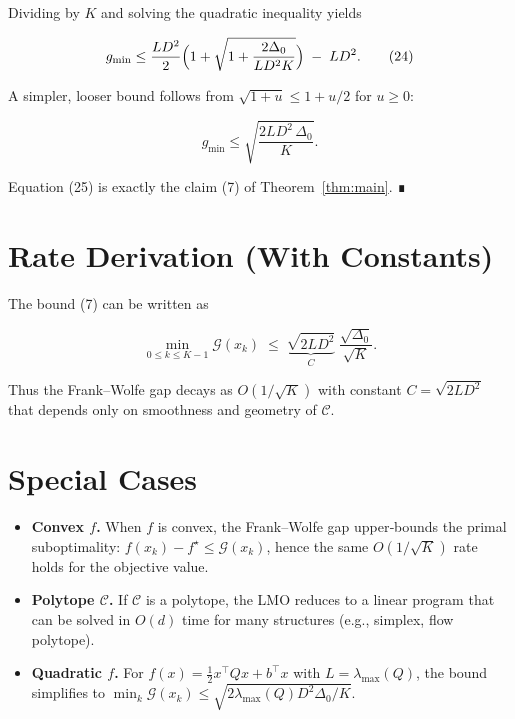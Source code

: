 \documentclass{article}
\newcommand{\gap}{\mathcal{G}}
\newcommand{\diam}{D}
\begin{document}
Dividing by $K$ and solving the quadratic inequality yields  

\[
g_{\min}\le
\frac{L\diam^{2}}{2}
\Bigl(1+\sqrt{1+\frac{2\Delta_{0}}{L\diam^{2}K}}\Bigr)
\;-\;L\diam^{2}.
\tag{24}
\]

A simpler, looser bound follows from $\sqrt{1+u}\le 1+u/2$ for $u\ge0$:

\[
g_{\min}\le \sqrt{\frac{2L\diam^{2}\,\Delta_{0}}{K}} .
\tag{25}
\]

Equation (25) is exactly the claim (7) of Theorem~\ref{thm:main}.  ∎

\section*{Rate Derivation (With Constants)}
The bound (7) can be written as  

\[
\boxed{\displaystyle
\min_{0\le k\le K-1}\gap(x_{k})\;\le\;
\underbrace{\sqrt{2L\diam^{2}}}_{C}\;\frac{\sqrt{\Delta_{0}}}{\sqrt{K}} }.
\]

Thus the Frank–Wolfe gap decays as $O(1/\sqrt{K})$ with constant $C=\sqrt{2L\diam^{2}}$ that depends only on smoothness and geometry of $\mathcal C$.

\section*{Special Cases}
\begin{itemize}
  \item \textbf{Convex $f$.} When $f$ is convex, the Frank–Wolfe gap upper‑bounds the primal suboptimality:
        $f(x_{k})-f^{\star}\le \gap(x_{k})$, hence the same $O(1/\sqrt{K})$ rate holds for the objective value.
  \item \textbf{Polytope $\mathcal C$.} If $\mathcal C$ is a polytope, the LMO reduces to a linear program that can be solved in $O(d)$ time for many structures (e.g., simplex, flow polytope).
  \item \textbf{Quadratic $f$.} For $f(x)=\tfrac12 x^{\top}Qx+b^{\top}x$ with $L=\lambda_{\max}(Q)$, the bound simplifies to
        $\min_{k}\gap(x_{k})\le \sqrt{2\lambda_{\max}(Q)D^{2}\Delta_{0}/K}$.
\end{itemize}
\end{document}
